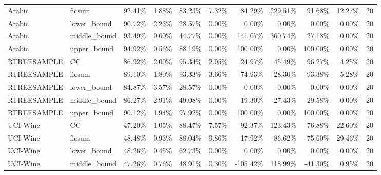 \begin{tabular}{llrrrrrrrrr}
      Arabic &        ficsum &           92.41\% & 1.88\% &     83.23\% &  7.32\% &                   84.29\% & 229.51\% &             91.68\% & 12.27\% &   20 \\
      Arabic &   lower\_bound &           90.72\% & 2.23\% &     28.57\% &  0.00\% &                    0.00\% &   0.00\% &              0.00\% &  0.00\% &   20 \\
      Arabic &  middle\_bound &           93.49\% & 0.60\% &     44.77\% &  0.00\% &                  141.07\% & 360.74\% &             27.18\% &  0.00\% &   20 \\
      Arabic &   upper\_bound &           94.92\% & 0.56\% &     88.19\% &  0.00\% &                  100.00\% &   0.00\% &            100.00\% &  0.00\% &   20 \\
 RTREESAMPLE &            CC &           86.92\% & 2.00\% &     95.34\% &  2.95\% &                   24.97\% &  45.49\% &             96.27\% &  4.25\% &   20 \\
 RTREESAMPLE &        ficsum &           89.10\% & 1.80\% &     93.33\% &  3.66\% &                   74.93\% &  28.30\% &             93.38\% &  5.28\% &   20 \\
 RTREESAMPLE &   lower\_bound &           84.87\% & 3.57\% &     28.57\% &  0.00\% &                    0.00\% &   0.00\% &              0.00\% &  0.00\% &   20 \\
 RTREESAMPLE &  middle\_bound &           86.27\% & 2.91\% &     49.08\% &  0.00\% &                   19.30\% &  27.43\% &             29.58\% &  0.00\% &   20 \\
 RTREESAMPLE &   upper\_bound &           90.12\% & 1.94\% &     97.92\% &  0.00\% &                  100.00\% &   0.00\% &            100.00\% &  0.00\% &   20 \\
    UCI-Wine &            CC &           47.20\% & 1.05\% &     88.47\% &  7.57\% &                  -92.37\% & 123.43\% &             76.88\% & 22.60\% &   20 \\
    UCI-Wine &        ficsum &           48.48\% & 0.93\% &     88.04\% &  9.86\% &                   17.92\% &  86.62\% &             75.60\% & 29.46\% &   20 \\
    UCI-Wine &   lower\_bound &           48.26\% & 0.45\% &     62.73\% &  0.00\% &                    0.00\% &   0.00\% &              0.00\% &  0.00\% &   20 \\
    UCI-Wine &  middle\_bound &           47.26\% & 0.76\% &     48.91\% &  0.30\% &                 -105.42\% & 118.99\% &            -41.30\% &  0.95\% &   20 \\

\end{tabular}
